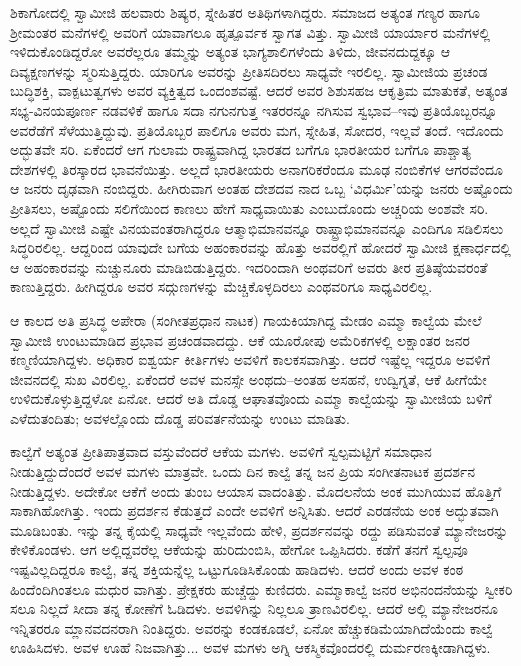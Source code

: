 ಶಿಕಾಗೋದಲ್ಲಿ ಸ್ವಾಮೀಜಿ ಹಲವಾರು ಶಿಷ್ಯರ, ಸ್ನೇಹಿತರ ಅತಿಥಿಗಳಾಗಿದ್ದರು. ಸಮಾಜದ ಅತ್ಯಂತ ಗಣ್ಯರ ಹಾಗೂ ಶ್ರೀಮಂತರ ಮನೆಗಳಲ್ಲಿ ಅವರಿಗೆ ಯಾವಾಗಲೂ ಹೃತ್ಪೂರ್ವಕ ಸ್ವಾಗತ ವಿತ್ತು. ಸ್ವಾಮೀಜಿ ಯಾರ್ಯಾರ ಮನೆಗಳಲ್ಲಿ ಇಳಿದುಕೊಂಡಿದ್ದರೋ ಅವರೆಲ್ಲರೂ ತಮ್ಮನ್ನು ಅತ್ಯಂತ ಭಾಗ್ಯಶಾಲಿಗಳೆಂದು ತಿಳಿದು, ಜೀವನದುದ್ದಕ್ಕೂ ಆ ದಿವ್ಯಕ್ಷಣಗಳನ್ನು ಸ್ಮರಿಸುತ್ತಿದ್ದರು. ಯಾರಿಗೂ ಅವರನ್ನು ಪ್ರೀತಿಸದಿರಲು ಸಾಧ್ಯವೇ ಇರಲಿಲ್ಲ. ಸ್ವಾಮೀಜಿಯ ಪ್ರಚಂಡ ಬುದ್ಧಿಶಕ್ತಿ, ವಾಕ್ಪಟುತ್ವಗಳು ಅವರ ವ್ಯಕ್ತಿತ್ವದ ಒಂದಂಶವಷ್ಟೆ. ಆದರೆ ಅವರ ಶಿಶುಸಹಜ ಆಕೃತ್ರಿಮ ಮಾತುಕತೆ, ಅತ್ಯಂತ ಸಭ್ಯ-ವಿನಯಪೂರ್ಣ ನಡವಳಿಕೆ ಹಾಗೂ ಸದಾ ನಗುನಗುತ್ತ ಇತರರನ್ನೂ ನಗಿಸುವ ಸ್ವಭಾವ–ಇವು ಪ್ರತಿಯೊಬ್ಬರನ್ನೂ ಅವರೆಡೆಗೆ ಸೆಳೆಯುತ್ತಿದ್ದುವು. ಪ್ರತಿಯೊಬ್ಬರ ಪಾಲಿಗೂ ಅವರು ಮಗ, ಸ್ನೇಹಿತ, ಸೋದರ, ಇಲ್ಲವೆ ತಂದೆ. ಇದೊಂದು ಅದ್ಭುತವೇ ಸರಿ. ಏಕೆಂದರೆ ಆಗ ಗುಲಾಮ ರಾಷ್ಟ್ರವಾಗಿದ್ದ ಭಾರತದ ಬಗೆಗೂ ಭಾರತೀಯರ ಬಗೆಗೂ ಪಾಶ್ಚಾತ್ಯ ದೇಶಗಳಲ್ಲಿ ತಿರಸ್ಕಾರದ ಭಾವನೆಯಿತ್ತು. ಅಲ್ಲದೆ ಭಾರತೀಯರು ಅನಾಗರಿಕರೆಂದೂ ಮೂಢ ನಂಬಿಕೆಗಳ ಆಗರವೆಂದೂ ಆ ಜನರು ದೃಢವಾಗಿ ನಂಬಿದ್ದರು. ಹೀಗಿರುವಾಗ ಅಂತಹ ದೇಶದವ ನಾದ ಒಬ್ಬ ‘ವಿಧರ್ಮಿ’ಯನ್ನು ಜನರು ಅಷ್ಟೊಂದು ಪ್ರೀತಿಸಲು, ಅಷ್ಟೊಂದು ಸಲಿಗೆಯಿಂದ ಕಾಣಲು ಹೇಗೆ ಸಾಧ್ಯವಾಯಿತು ಎಂಬುದೊಂದು ಅಚ್ಚರಿಯ ಅಂಶವೇ ಸರಿ. ಅಲ್ಲದೆ ಸ್ವಾಮೀಜಿ ಎಷ್ಟೇ ವಿನಯವಂತರಾಗಿದ್ದರೂ ಆತ್ಮಾಭಿಮಾನವನ್ನೂ ರಾಷ್ಟ್ರಾಭಿಮಾನವನ್ನೂ ಎಂದಿಗೂ ಸಡಿಲಿಸಲು ಸಿದ್ಧರಿರಲಿಲ್ಲ. ಆದ್ದರಿಂದ ಯಾವುದೇ ಬಗೆಯ ಅಹಂಕಾರವನ್ನು ಹೊತ್ತು ಅವರಲ್ಲಿಗೆ ಹೋದರೆ ಸ್ವಾಮೀಜಿ ಕ್ಷಣಾರ್ಧದಲ್ಲಿ ಆ ಅಹಂಕಾರವನ್ನು ನುಚ್ಚುನೂರು ಮಾಡಿಬಿಡುತ್ತಿದ್ದರು. ಇದರಿಂದಾಗಿ ಅಂಥವರಿಗೆ ಅವರು ತೀರ ಪ್ರತಿಷ್ಠೆಯವರಂತೆ ಕಾಣುತ್ತಿದ್ದರು. ಹೀಗಿದ್ದರೂ ಅವರ ಸದ್ಗುಣಗಳನ್ನು ಮೆಚ್ಚಿಕೊಳ್ಳದಿರಲು ಎಂಥವರಿಗೂ ಸಾಧ್ಯವಿರಲಿಲ್ಲ.

ಆ ಕಾಲದ ಅತಿ ಪ್ರಸಿದ್ಧ ಅಪೇರಾ (ಸಂಗೀತಪ್ರಧಾನ ನಾಟಕ) ಗಾಯಕಿಯಾಗಿದ್ದ ಮೇಡಂ ಎಮ್ಮಾ ಕಾಲ್ವೆಯ ಮೇಲೆ ಸ್ವಾಮೀಜಿ ಉಂಟುಮಾಡಿದ ಪ್ರಭಾವ ಪ್ರಚಂಡವಾದದ್ದು. ಆಕೆ ಯೂರೋಪು ಅಮೆರಿಕಗಳಲ್ಲಿ ಲಕ್ಷಾಂತರ ಜನರ ಕಣ್ಮಣಿಯಾಗಿದ್ದಳು. ಅಧಿಕಾರ ಐಶ್ವರ್ಯ ಕೀರ್ತಿಗಳು ಅವಳಿಗೆ ಕಾಲಕಸವಾಗಿತ್ತು. ಆದರೆ ಇಷ್ಟೆಲ್ಲ ಇದ್ದರೂ ಅವಳಿಗೆ ಜೀವನದಲ್ಲಿ ಸುಖ ವಿರಲಿಲ್ಲ. ಏಕೆಂದರೆ ಅವಳ ಮನಸ್ಸೇ ಅಂಥದು–ಅಂತಹ ಅಸಹನೆ, ಉದ್ವಿಗ್ನತೆ, ಆಕೆ ಹೀಗೆಯೇ ಉಳಿದುಕೊಳ್ಳುತ್ತಿದ್ದಳೋ ಏನೋ. ಆದರೆ ಅತಿ ದೊಡ್ಡ ಆಘಾತವೊಂದು ಎಮ್ಮಾ ಕಾಲ್ವೆಯನ್ನು ಸ್ವಾಮೀಜಿಯ ಬಳಿಗೆ ಎಳೆದುತಂದಿತು; ಅವಳಲ್ಲೊಂದು ದೊಡ್ಡ ಪರಿವರ್ತನೆಯನ್ನು ಉಂಟು ಮಾಡಿತು.

ಕಾಲ್ವೆಗೆ ಅತ್ಯಂತ ಪ್ರೀತಿಪಾತ್ರವಾದ ವಸ್ತುವೆಂದರೆ ಆಕೆಯ ಮಗಳು. ಅವಳಿಗೆ ಸ್ವಲ್ಪಮಟ್ಟಿಗೆ ಸಮಾಧಾನ ನೀಡುತ್ತಿದ್ದುದೆಂದರೆ ಅವಳ ಮಗಳು ಮಾತ್ರವೇ. ಒಂದು ದಿನ ಕಾಲ್ವೆ ತನ್ನ ಜನ ಪ್ರಿಯ ಸಂಗೀತನಾಟಕ ಪ್ರದರ್ಶನ ನೀಡುತ್ತಿದ್ದಳು. ಅದೇಕೋ ಆಕೆಗೆ ಅಂದು ತುಂಬ ಆಯಾಸ ವಾದಂತಿತ್ತು. ಮೊದಲನೆಯ ಅಂಕ ಮುಗಿಯುವ ಹೊತ್ತಿಗೆ ಸಾಕಾಗಿಹೋಗಿತ್ತು. ಇಂದು ಪ್ರದರ್ಶನ ಕೆಡುತ್ತದೆ ಎಂದೇ ಅವಳಿಗೆ ಅನ್ನಿಸಿತು. ಆದರೆ ಎರಡನೆಯ ಅಂಕ ಅದ್ಭುತವಾಗಿ ಮೂಡಿಬಂತು. ಇನ್ನು ತನ್ನ ಕೈಯಲ್ಲಿ ಸಾಧ್ಯವೇ ಇಲ್ಲವೆಂದು ಹೇಳಿ, ಪ್ರದರ್ಶನವನ್ನು ರದ್ದು ಪಡಿಸುವಂತೆ ಮ್ಯಾನೇಜರನ್ನು ಕೇಳಿಕೊಂಡಳು. ಆಗ ಅಲ್ಲಿದ್ದವರೆಲ್ಲ ಆಕೆಯನ್ನು ಹುರಿದುಂಬಿಸಿ, ಹೇಗೋ ಒಪ್ಪಿಸಿದರು. ಕಡೆಗೆ ತನಗೆ ಸ್ವಲ್ಪವೂ ಇಷ್ಟವಿಲ್ಲದಿದ್ದರೂ ಕಾಲ್ವೆ, ತನ್ನ ಶಕ್ತಿಯನ್ನೆಲ್ಲ ಒಟ್ಟುಗೂಡಿಸಿಕೊಂಡು ಹಾಡಿದಳು. ಆದರೆ ಅಂದು ಅವಳ ಕಂಠ ಹಿಂದೆಂದಿಗಿಂತಲೂ ಮಧುರ ವಾಗಿತ್ತು. ಪ್ರೇಕ್ಷಕರು ಹುಚ್ಚೆದ್ದು ಕುಣಿದರು. ಎಮ್ಮಾಕಾಲ್ವೆ ಜನರ ಅಭಿನಂದನೆಯನ್ನು ಸ್ವೀಕರಿ ಸಲೂ ನಿಲ್ಲದೆ ಸೀದಾ ತನ್ನ ಕೋಣೆಗೆ ಓಡಿದಳು. ಅವಳಿಗಿನ್ನು ನಿಲ್ಲಲೂ ತ್ರಾಣವಿರಲಿಲ್ಲ. ಆದರೆ ಅಲ್ಲಿ ಮ್ಯಾನೇಜರನೂ ಇನ್ನಿತರರೂ ಮ್ಲಾನವದನರಾಗಿ ನಿಂತಿದ್ದರು. ಅವರನ್ನು ಕಂಡಕೂಡಲೆ, ಏನೋ ಹೆಚ್ಚುಕಡಿಮೆಯಾಗಿದೆಯೆಂದು ಕಾಲ್ವೆ ಊಹಿಸಿದಳು. ಅವಳ ಊಹೆ ನಿಜವಾಗಿತ್ತು... ಅವಳ ಮಗಳು ಅಗ್ನಿ ಆಕಸ್ಮಿಕವೊಂದರಲ್ಲಿ ದುರ್ಮರಣಕ್ಕೀಡಾಗಿದ್ದಳು.

